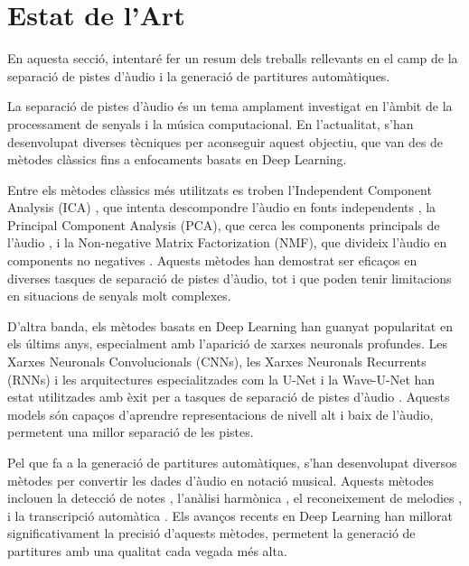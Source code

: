 ﻿\documentclass[10pt,a4paper,twocolumn,twoside]{article}
\begin{document}
\section{Estat de l'Art}
\label{sec:estat_art}

En aquesta secció, intentaré fer un resum dels treballs rellevants en el camp de la separació de pistes d'àudio i la generació de partitures automàtiques.

La separació de pistes d'àudio és un tema amplament investigat en l'àmbit de la processament de senyals i la música computacional. En l'actualitat, s'han desenvolupat diverses tècniques per aconseguir aquest objectiu, que van des de mètodes clàssics fins a enfocaments basats en Deep Learning.

Entre els mètodes clàssics més utilitzats es troben l'Independent Component Analysis (ICA) \cite{ICA_Sawada_Ono_Kameoka_Kitamura_Saruwatari_2019}, que intenta descompondre l'àudio en fonts independents \cite{ICA_hyvarinen2000independent}, la Principal Component Analysis (PCA), que cerca les components principals de l'àudio \cite{PCA_jolliffe2002principal}, i la Non-negative Matrix Factorization (NMF), que divideix l'àudio en components no negatives \cite{NMF_lee1999learning}. Aquests mètodes han demostrat ser eficaços en diverses tasques de separació de pistes d'àudio, tot i que poden tenir limitacions en situacions de senyals molt complexes.

D'altra banda, els mètodes basats en Deep Learning han guanyat popularitat en els últims anys, especialment amb l'aparició de xarxes neuronals profundes. Les Xarxes Neuronals Convolucionals (CNNs), les Xarxes Neuronals Recurrents (RNNs) i les arquitectures especialitzades com la U-Net i la Wave-U-Net han estat utilitzades amb èxit per a tasques de separació de pistes d'àudio \cite{hershey2016deep,grill2017two,CNN_jansson2017singing,lva2018waveunet}. Aquests models són capaços d'aprendre representacions de nivell alt i baix de l'àudio, permetent una millor separació de les pistes.

Pel que fa a la generació de partitures automàtiques, s'han desenvolupat diversos mètodes per convertir les dades d'àudio en notació musical. Aquests mètodes inclouen la detecció de notes \cite{raffel2014mir_eval}, l'anàlisi harmònica \cite{pardo2002improved}, el reconeixement de melodies \cite{abdallah2004fundamental}, i la transcripció automàtica \cite{benetos2013automatic}. Els avanços recents en Deep Learning han millorat significativament la precisió d'aquests mètodes, permetent la generació de partitures amb una qualitat cada vegada més alta.
\end{document}
